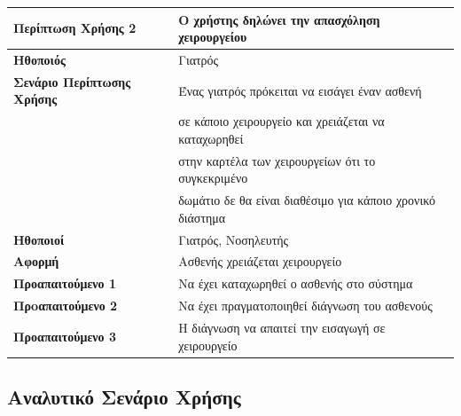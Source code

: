 \documentclass{article}
\newcommand\T{\rule{0pt}{2.6ex}}       %
\newcommand\B{\rule[-1.2ex]{0pt}{0pt}}
\begin{document}
\begin{center}
     \begin{tabular}{|l|l|}
     \hline
      \textbf{Περίπτωση Χρήσης 2} & Ο χρήστης δηλώνει την απασχόληση χειρουργείου \T\B \\ 
      \hline
      \textbf{Ηθοποιός} & Γιατρός \T\B \\
      \hline
      \textbf{Σενάριο Περίπτωσης Χρήσης} & Ένας γιατρός πρόκειται να εισάγει έναν ασθενή \T \\& σε κάποιο χειρουργείο και χρειάζεται να καταχωρηθεί\\& στην καρτέλα των χειρουργείων ότι το συγκεκριμένο\\& δωμάτιο δε θα είναι διαθέσιμο για κάποιο χρονικό διάστημα \B \\
      \hline
      \textbf{Ηθοποιοί} & Γιατρός, Νοσηλευτής \T\B \\
      \hline
      \textbf{Αφορμή} & Ασθενής χρειάζεται χειρουργείο \T\B \\
      \hline
      \textbf{Προαπαιτούμενο 1} & Να έχει καταχωρηθεί ο ασθενής στο σύστημα \T\B \\
      \hline
      \textbf{Πρoαπαιτούμενο 2} & Να έχει πραγματοποιηθεί διάγνωση του ασθενούς \T\B \\
      \hline
      \textbf{Προαπαιτούμενο 3} & Η διάγνωση να απαιτεί την εισαγωγή σε χειρουργείο \T\B \\
      \hline
     \end{tabular}
 \end{center}
 
 \newpage
 
  \subsection{Αναλυτικό Σενάριο Χρήσης}
 
\end{document}
